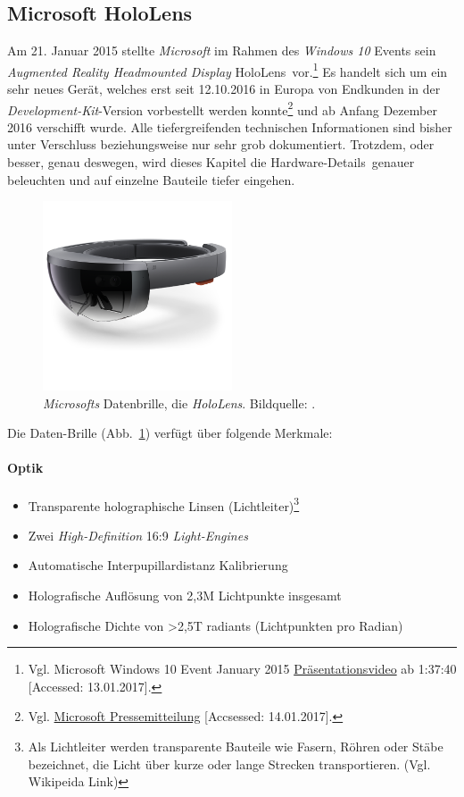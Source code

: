 \subsection{Microsoft HoloLens}\label{ssec:msHoloLens}
Am 21. Januar 2015 stellte \textit{Microsoft} im Rahmen des \textit{Windows 10} Events sein \textit{Augmented Reality Headmounted Display} \frqq HoloLens\flqq\ vor.\footnote{ Vgl. Microsoft Windows 10 Event January 2015 \href{https://www.youtube.com/watch?v=LP0FFKQkE7s&feature=youtu.be&t=1h37m40s}{Präsentationsvideo} ab 1:37:40 [Accessed: 13.01.2017].} Es handelt sich um ein sehr neues Gerät, welches erst seit 12.10.2016 in Europa von Endkunden in der \textit{Development-Kit}-Version vorbestellt werden konnte\footnote{ Vgl. \href{http://news.microsoft.com/europe/features/microsoft-hololens-comes-to-europe/}{Microsoft Pressemitteilung} [Accsessed: 14.01.2017].} und ab Anfang Dezember 2016 verschifft wurde. Alle tiefergreifenden technischen Informationen sind bisher unter Verschluss beziehungsweise nur sehr grob dokumentiert. Trotzdem, oder besser, genau deswegen, wird dieses Kapitel die \frqq Hardware-Details\flqq\ genauer beleuchten und auf einzelne Bauteile tiefer eingehen.
\begin{figure}[H]
	\centering
	\includegraphics[width=0.5\textwidth]{figuren/hololens}
	\caption{\textit{Microsofts} Datenbrille, die \textit{HoloLens}. Bildquelle: \cite{holoLens}.}
	\label{fig:hololens}
\end{figure}
Die Daten-Brille (Abb.~\ref{fig:hololens}) verfügt über folgende Merkmale:
\paragraph*{Optik}
\begin{itemize}
	\item Transparente holographische Linsen (Lichtleiter)\footnote{ Als Lichtleiter werden transparente Bauteile wie Fasern, Röhren oder Stäbe bezeichnet, die Licht über kurze oder lange Strecken transportieren. (Vgl. Wikipeida Link)}
	\item Zwei \textit{High-Definition} 16:9 \textit{Light-Engines}
	\item Automatische Interpupillardistanz Kalibrierung
	\item Holografische Auflösung von 2,3M Lichtpunkte insgesamt
	\item Holografische Dichte von >2,5T radiants (Lichtpunkten pro Radian)
\end{itemize}
